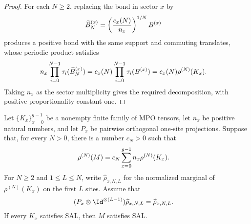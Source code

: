 \begin{proof}\leanok
    For each $N\geq2$, replacing the bond in sector $x$ by
    \begin{align}
        \widetilde B^{(x)}_N
         & =\left(\frac{c_x(N)}{n_x}\right)^{1/N}B^{(x)}
        \notag
    \end{align}
    produces a positive bond with the same support and commuting translates,
    whose periodic product satisfies
    \begin{align}
        n_x\prod_{i=0}^{N-1}\tau_i(\widetilde B^{(x)}_N)
         & =c_x(N)\prod_{i=0}^{N-1}\tau_i(B^{(x)})
        =c_x(N)\rho^{(N)}(K_x).
        \notag
    \end{align}
    Taking $n_x$ as the sector multiplicity gives the required decomposition,
    with positive proportionality constant one.
\end{proof}

\begin{lemma}
    \label{thm:mpdo_proportional_local_orthogonal_sum_sal}
    \leanok
    Let $\{K_x\}_{x=0}^{g-1}$ be a nonempty finite family of MPO tensors,
    let $n_x$ be positive natural numbers, and let $P_x$ be pairwise
    orthogonal one-site projections. Suppose that, for every $N>0$, there is
    a number $c_N>0$ such that
    \begin{align}
        \rho^{(N)}(M)
         & =c_N\sum_{x=0}^{g-1}n_x\rho^{(N)}(K_x).
        \notag
    \end{align}
    For $N\geq2$ and $1\leq L\leq N$, write
    $\widehat\rho_{x,N,L}$ for the normalized marginal of
    $\rho^{(N)}(K_x)$ on the first $L$ sites. Assume that
    \begin{align}
        (P_x\otimes\Id^{\otimes(L-1)})
        \widehat\rho_{x,N,L}
         & =\widehat\rho_{x,N,L}.
        \notag
    \end{align}
    If every $K_x$ satisfies SAL, then $M$ satisfies SAL.

\end{lemma}

